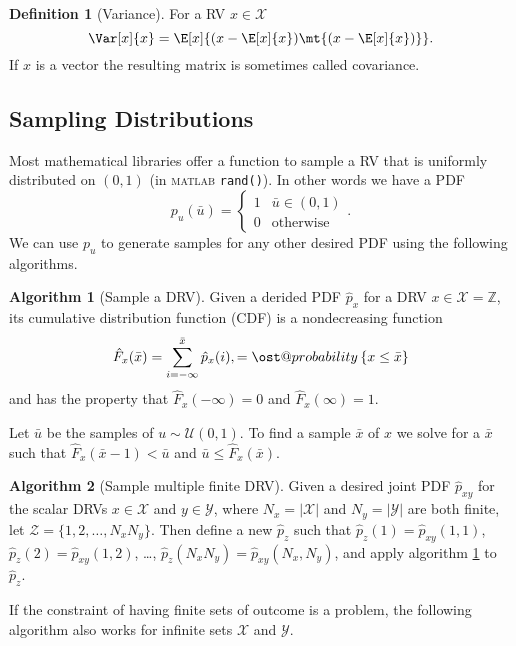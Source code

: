 \documentclass[]{hsrzf}
\makeatletter
\renewcommand*{\Pr}[2][]{\ost@probability_{#1}\left\{#2\right\}}
\theoremstyle{plain}
\theoremstyle{definition}
\newtheorem{defn}{Definition}[section]
\newtheorem{alg}{Algorithm}[section]
\theoremstyle{remark}
\makeatother
\begin{document}
\begin{defn}[Variance]
  For a RV $x \in \mathcal{X}$
  \[
    \Var[x]{x} = \E[x]{(x - \E[x]{x})\mt{(x - \E[x]{x})}}.
  \]
  If $x$ is a vector the resulting matrix is sometimes called covariance.
\end{defn}

\subsection{Sampling Distributions} 
\label{sec:probability-review:sampling-distributions}

Most mathematical libraries offer a function to sample a RV that is uniformly
distributed on $(0,1)$ (in \textsc{matlab} \texttt{rand()}). In other words we
have a PDF
\[
  p_u(\bar{u}) = \begin{cases}
    1 & \bar{u} \in (0,1) \\
    0 & \text{otherwise}
  \end{cases}.
\]
We can use $p_u$ to generate samples for any other desired PDF using the
following algorithms.

\begin{alg}[Sample a DRV] \label{alg:sample-drv}
  Given a derided PDF $\hat{p}_x$ for a DRV $x \in \mathcal{X} = \mathbb{Z}$,
  its cumulative distribution function (CDF) is a nondecreasing function
  \[
    \hat{F}_x (\bar{x}) = \sum_{i = -\infty}^{\bar{x}} \hat{p}_x (i),
    = \Pr{x \leq \bar{x}}
  \]
  and has the property that $\hat{F}_x(-\infty) = 0$ and $\hat{F}_x(\infty) =
  1$.

  Let $\bar{u}$ be the samples of $u \sim \mathcal{U}(0,1)$. To find
  a sample $\bar{x}$ of $x$ we solve for a $\bar{x}$ such that
  $\hat{F}_x(\bar{x} -1) < \bar{u}$ and $\bar{u} \leq \hat{F}_x(\bar{x})$.
\end{alg}

\begin{alg}[Sample multiple finite DRV]
  Given a desired joint PDF $\hat{p}_{xy}$ for the scalar DRVs $x \in
  \mathcal{X}$ and $y \in \mathcal{Y}$, where $N_x = |\mathcal{X}|$ and
  $N_y = |\mathcal{Y}|$ are both finite, let $\mathcal{Z} = \{1,2,\ldots,
  N_xN_y\}$. Then define a new $\hat{p}_z$ such that $\hat{p}_z(1) =
  \hat{p}_{xy}(1,1)$, $\hat{p}_z(2) = \hat{p}_{xy}(1,2)$, \dots,
  $\hat{p}_z(N_xN_y) = \hat{p}_{xy}(N_x, N_y)$, and apply algorithm
  \ref{alg:sample-drv} to $\hat{p}_z$.
\end{alg}

If the constraint of having finite sets of outcome is a problem, the following
algorithm also works for infinite sets $\mathcal{X}$ and $\mathcal{Y}$.
\end{document}

